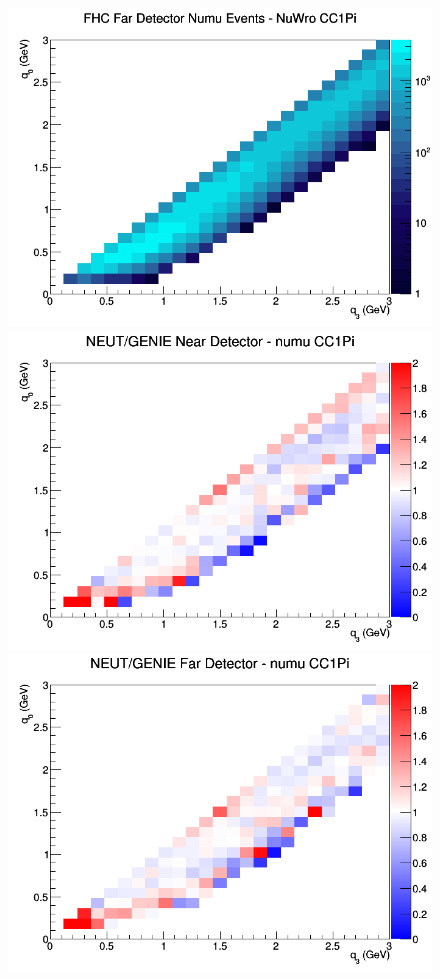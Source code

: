 \begin{figure}[h]
\endminipage
{}
\includegraphics[width=\linewidth]{q0_q3/nominal/CC1Pi_FHC_FD_numu_q3_q0_NuWro.png}
\endminipage
\newline
{}
\includegraphics[width=\linewidth]{q0_q3/nominal/ratios/CC1Pi_NEUT_GENIE_numu_near_q3_q0.png}
\endminipage
{}
\includegraphics[width=\linewidth]{q0_q3/nominal/ratios/CC1Pi_NEUT_GENIE_numu_far_q3_q0.png}

\end{figure}
